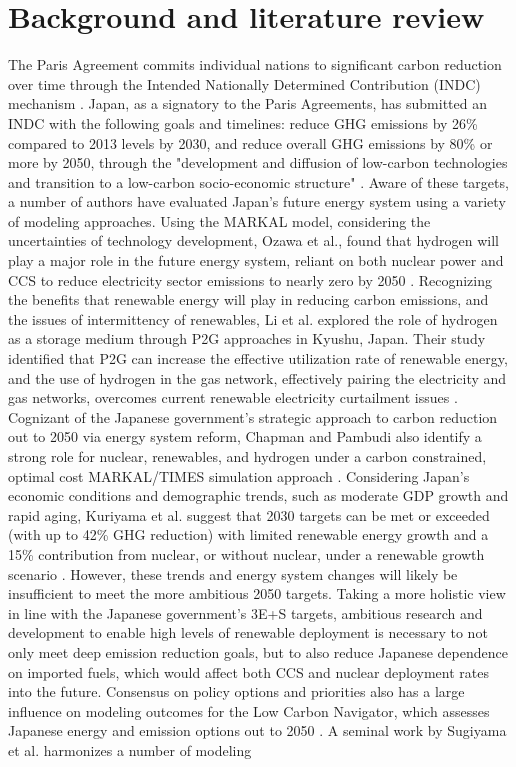 \section{Background and literature review} \label{litreview}
The Paris Agreement commits individual nations to significant carbon reduction over time through the Intended Nationally Determined Contribution (INDC) mechanism \cite{united_nations_framework_convention_on_climate_change_unfccc_submission_2015}. Japan, as a signatory to the Paris Agreements, has submitted an INDC with the following goals and timelines: reduce GHG emissions by 26\% compared to 2013 levels by 2030, and reduce overall GHG emissions by 80\% or more by 2050, through the "development and diffusion of low-carbon technologies and transition to a low-carbon socio-economic structure" \cite{united_nations_framework_convention_on_climate_change_unfccc_submission_2015}. Aware of these targets, a number of authors have evaluated Japan's future energy system using a variety of modeling approaches. Using the \gls{MARKAL} model, considering the uncertainties of technology development, Ozawa et al., found that hydrogen will play a major role in the future energy system, reliant on both nuclear power and \gls{CCS} to reduce electricity sector emissions to nearly zero by 2050 \cite{ozawa_hydrogen_2018}. Recognizing the benefits that renewable energy will play in reducing carbon emissions, and the issues of intermittency of renewables, Li et al. explored the role of hydrogen as a storage medium through \gls{P2G} approaches in Kyushu, Japan. Their study identified that \gls{P2G} can increase the effective utilization rate of renewable energy, and the use of hydrogen in the gas network, effectively pairing the electricity and gas networks, overcomes current renewable electricity curtailment issues \cite{li_potential_2019}. Cognizant of the Japanese government's strategic approach to carbon reduction out to 2050 via energy system reform, Chapman and Pambudi also identify a strong role for nuclear, renewables, and hydrogen under a carbon constrained, optimal cost MARKAL/TIMES simulation approach \cite{chapman_strategic_2018}. Considering Japan's economic conditions and demographic trends, such as moderate GDP growth and rapid aging, Kuriyama et al. suggest that 2030 targets can be met or exceeded (with up to 42\% GHG reduction) with limited renewable energy growth and a 15\% contribution from nuclear, or without nuclear, under a renewable growth scenario \cite{kuriyama_can_2019}. However, these trends and energy system changes will likely be insufficient to meet the more ambitious 2050 targets. Taking a more holistic view in line with the Japanese government's 3E+S targets, ambitious research and development to enable high levels of renewable deployment is necessary to not only meet deep emission reduction goals, but to also reduce Japanese dependence on imported fuels, which would affect both CCS and nuclear deployment rates into the future. Consensus on policy options and priorities also has a large influence on modeling outcomes for the Low Carbon Navigator, which assesses Japanese energy and emission options out to 2050 \cite{moinuddin_japan_2019}. A seminal work by Sugiyama et al. harmonizes a number of modeling 